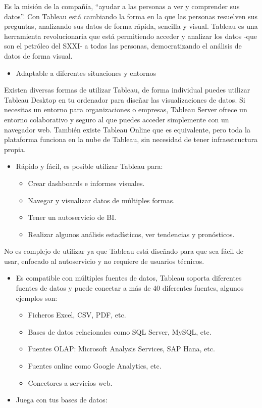 \documentclass[
]{book}
\providecommand{\tightlist}{%
  \setlength{\itemsep}{0pt}\setlength{\parskip}{0pt}}
\begin{document}
Es la misión de la compañía, ``ayudar a las personas a ver y comprender sus datos''. Con Tableau está cambiando la forma en la que las personas resuelven sus preguntas, analizando sus datos de forma rápida, sencilla y visual.
Tableau es una herramienta revolucionaria que está permitiendo acceder y analizar los datos -que son el petróleo del SXXI- a todas las personas, democratizando el análisis de datos de forma visual.

\begin{itemize}
\tightlist
\item
  Adaptable a diferentes situaciones y entornos
\end{itemize}

Existen diversas formas de utilizar Tableau, de forma individual puedes utilizar Tableau Desktop en tu ordenador para diseñar las visualizaciones de datos.
Si necesitas un entorno para organizaciones o empresas, Tableau Server ofrece un entorno colaborativo y seguro al que puedes acceder simplemente con un navegador web. También existe Tableau Online que es equivalente, pero toda la plataforma funciona en la nube de Tableau, sin necesidad de tener infraestructura propia.

\begin{itemize}
\tightlist
\item
  Rápido y fácil, es posible utilizar Tableau para:

  \begin{itemize}
  \tightlist
  \item
    Crear dashboards e informes visuales.
  \item
    Navegar y visualizar datos de múltiples formas.
  \item
    Tener un autoservicio de BI.
  \item
    Realizar algunos análisis estadísticos, ver tendencias y pronósticos.
  \end{itemize}
\end{itemize}

No es complejo de utilizar ya que Tableau está diseñado para que sea fácil de usar, enfocado al autoservicio y no requiere de usuarios técnicos.

\begin{itemize}
\tightlist
\item
  Es compatible con múltiples fuentes de datos, Tableau soporta diferentes fuentes de datos y puede conectar a más de 40 diferentes fuentes, algunos ejemplos son:

  \begin{itemize}
  \tightlist
  \item
    Ficheros Excel, CSV, PDF, etc.
  \item
    Bases de datos relacionales como SQL Server, MySQL, etc.
  \item
    Fuentes OLAP: Microsoft Analysis Services, SAP Hana, etc.
  \item
    Fuentes online como Google Analytics, etc.
  \item
    Conectores a servicios web.
  \end{itemize}
\item
  Juega con tus bases de datos:
\end{itemize}
\end{document}
